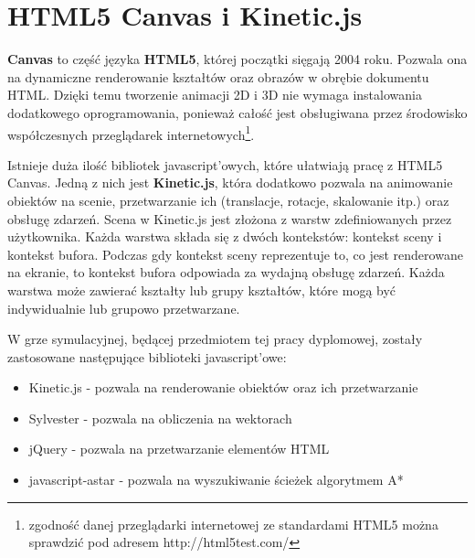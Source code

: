 \section{HTML5 Canvas i Kinetic.js}
\textbf{Canvas} to część języka \textbf{HTML5}, której początki sięgają 2004 roku. Pozwala ona na dynamiczne renderowanie kształtów oraz obrazów w obrębie dokumentu HTML. Dzięki temu tworzenie animacji 2D i 3D nie wymaga instalowania dodatkowego oprogramowania, ponieważ całość jest obsługiwana przez środowisko współczesnych przeglądarek internetowych\footnote{zgodność danej przeglądarki internetowej ze standardami HTML5 można sprawdzić pod adresem http://html5test.com/}.

Istnieje duża ilość bibliotek javascript'owych, które ułatwiają pracę z HTML5 Canvas. Jedną z nich jest \textbf{Kinetic.js}, która dodatkowo pozwala na animowanie obiektów na scenie, przetwarzanie ich (translacje, rotacje, skalowanie itp.) oraz obsługę zdarzeń. Scena w Kinetic.js jest złożona z warstw zdefiniowanych przez użytkownika. Każda warstwa składa się z dwóch kontekstów: kontekst sceny i kontekst bufora. Podczas gdy kontekst sceny reprezentuje to, co jest renderowane na ekranie, to kontekst bufora odpowiada za wydajną obsługę zdarzeń. Każda warstwa może zawierać kształty lub grupy kształtów, które mogą być indywidualnie lub grupowo przetwarzane.

W grze symulacyjnej, będącej przedmiotem tej pracy dyplomowej, zostały zastosowane następujące biblioteki javascript'owe:
\begin{itemize}
	\item Kinetic.js\cite{kineticPage} - pozwala na renderowanie obiektów oraz ich przetwarzanie
	\item Sylvester\cite{sylvesterPage} - pozwala na obliczenia na wektorach 
	\item jQuery\cite{jqueryPage} - pozwala na przetwarzanie elementów HTML
	\item javascript-astar\cite{astarPage} - pozwala na wyszukiwanie ścieżek algorytmem A*
\end{itemize}
